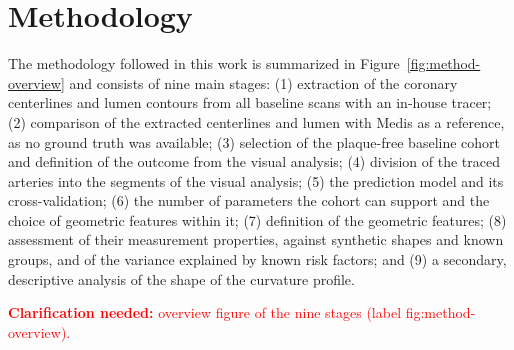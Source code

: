 \providecommand{\clarify}[1]{\textcolor{red}{\textbf{Clarification needed:} #1}}
\chapter{Methodology}
\label{ch:methodology}

The methodology followed in this work is summarized in Figure~\ref{fig:method-overview} and consists of nine main stages:
(1) extraction of the coronary centerlines and lumen contours from all baseline scans with an in-house tracer;
(2) comparison of the extracted centerlines and lumen with Medis as a reference, as no ground truth was available;
(3) selection of the plaque-free baseline cohort and definition of the outcome from the visual analysis;
(4) division of the traced arteries into the segments of the visual analysis;
(5) the prediction model and its cross-validation;
(6) the number of parameters the cohort can support and the choice of geometric features within it;
(7) definition of the geometric features;
(8) assessment of their measurement properties, against synthetic shapes and known groups, and of the variance explained by known risk factors;
and (9) a secondary, descriptive analysis of the shape of the curvature profile.

\clarify{overview figure of the nine stages (label fig:method-overview).}
